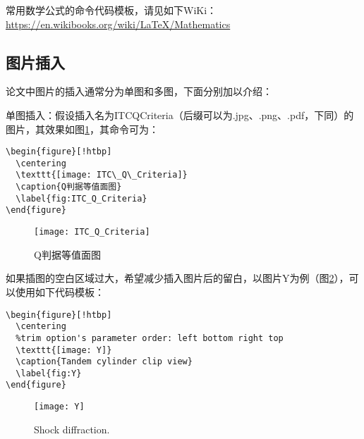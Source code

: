 常用数学公式的命令代码模板，请见如下WiKi：\url{https://en.wikibooks.org/wiki/LaTeX/Mathematics}

\subsection{图片插入}

论文中图片的插入通常分为单图和多图，下面分别加以介绍：

单图插入：假设插入名为ITC\textunderscore Q\textunderscore Criteria（后缀可以为.jpg、.png、.pdf，下同）的图片，其效果如图\ref{fig:ITC_Q_Criteria}，其命令可为：
\begin{verbatim}
\begin{figure}[!htbp]
  \centering
  \texttt{[image: ITC\_Q\_Criteria]}
  \caption{Q判据等值面图}
  \label{fig:ITC_Q_Criteria}
\end{figure}
\end{verbatim}
\begin{figure}[!htbp]
  \centering
  \texttt{[image: ITC\_Q\_Criteria]}
  \caption{Q判据等值面图}
  \label{fig:ITC_Q_Criteria}
\end{figure}

如果插图的空白区域过大，希望减少插入图片后的留白，以图片Y为例（图\ref{fig:Y}），可以使用如下代码模板：
\begin{verbatim}
\begin{figure}[!htbp]
  \centering
  %trim option's parameter order: left bottom right top
  \texttt{[image: Y]}
  \caption{Tandem cylinder clip view}
  \label{fig:Y}
\end{figure}
\end{verbatim}
\begin{figure}[!htbp]
  \centering
  \texttt{[image: Y]}
  \caption{Shock diffraction.}
  \label{fig:Y}
\end{figure}

